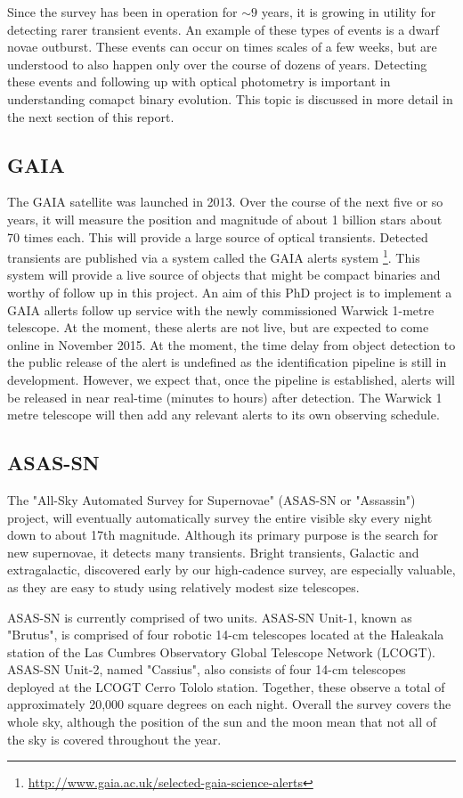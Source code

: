 \documentclass[a4paper,fleqn,usenatbib]{mnras}
\begin{document}
Since the survey has been in operation for $\sim 9$ years, it is growing in utility for detecting rarer transient events. An example of these types of events is a dwarf novae outburst. These events can occur on times scales of a few weeks, but are understood to also happen only over the course of dozens of years. Detecting these events and following up with optical photometry is important in understanding comapct binary evolution. This topic is discussed in more detail in the next section of this report. 

\subsection{GAIA}
The GAIA satellite was launched in 2013. Over the course of the next five or so years, it will measure the position and magnitude of about 1 billion stars about 70 times each. This will provide a large source of optical transients. Detected transients are published via a system called the GAIA alerts system  \footnote{\url{http://www.gaia.ac.uk/selected-gaia-science-alerts}}. This system will provide a live source of objects that might be compact binaries and worthy of follow up in this project. An aim of this PhD project is to implement a GAIA allerts follow up service with the newly commissioned Warwick 1-metre telescope.  At the moment, these alerts are not live, but are expected to come online in November 2015. At the moment, the time delay from object detection to the public release of the alert is undefined as the identification pipeline is still in development. However, we expect that, once the pipeline is established, alerts will be released in near real-time (minutes to hours) after detection. The Warwick 1 metre telescope will then add any relevant alerts to its own observing schedule.  

\subsection{ASAS-SN}
The "All-Sky Automated Survey for Supernovae" (ASAS-SN or "Assassin") project, will eventually automatically survey the entire visible sky every night down to about 17th magnitude. Although its primary purpose is the search for new supernovae, it detects many transients.  Bright transients, Galactic and extragalactic, discovered early by our high-cadence survey, are especially valuable, as they are easy to study using relatively modest size telescopes.

ASAS-SN is currently comprised of two units. ASAS-SN Unit-1, known as "Brutus", is comprised of four robotic 14-cm telescopes located at the Haleakala station of the Las Cumbres Observatory Global Telescope Network (LCOGT). ASAS-SN Unit-2, named "Cassius", also consists of four 14-cm telescopes deployed at the LCOGT Cerro Tololo station. Together, these observe a total of approximately 20,000 square degrees on each night. Overall the survey covers the whole sky, although the position of the sun and the moon mean that not all of the sky is covered throughout the year. 
\end{document}
